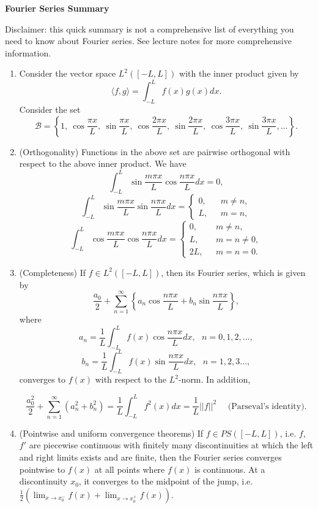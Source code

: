 \documentclass[a4paper]{article}
\theoremstyle{definition}
\numberwithin{equation}{section}
\begin{document}
\begin{center}
\large \textbf{Fourier Series Summary}
\end{center}
Disclaimer: this quick summary is not a comprehensive list of everything you need to know about Fourier series.  See lecture notes for more comprehensive information.
\normalsize

\begin{enumerate}
	\item Consider the vector space $L^2([-L, L])$ with the inner product given by 
\[\langle f,g\rangle =\int_{-L}^L f(x)g(x)dx.\]
Consider the set 
\[\mathcal B= \left\{1,\ \cos \frac{\pi x}{L},\  \sin \frac{\pi x}{L},\  \cos \frac{2\pi x}{L},\  \sin \frac{2\pi x}{L},\  \cos \frac{3\pi x}{L} ,\  \sin \frac{3\pi x}{L}, \ldots\right\}.\] 
  \item (Orthogonality) Functions in the above set are pairwise orthogonal with respect to the above inner product.  We have 
\[\int_{-L}^L \sin \frac{m\pi x}{L}\cos \frac{n\pi x}{L}dx=0,\]
\[\int_{-L}^L \sin \frac{m\pi x}{L}\sin \frac{n\pi x}{L}dx =\left\{ \begin{array}{ll} 0, & \ \ \ m\neq n, \\ L, & \ \ \  m=n,\end{array} \right.\]
\[\int_{-L}^L \cos \frac{m\pi x}{L}\cos \frac{n\pi x}{L}dx =\left\{ \begin{array}{ll} 0, & \ \ \ m\neq n, \\ L, & \ \ \  m=n\neq 0, \\ 2L, & \ \ \ m=n=0.\end{array} \right.\]


\item (Completeness) If $f\in L^2([-L, L])$, then its Fourier series, which is given by 
\[\frac{a_0}{2}+\sum_{n=1}^\infty\left\{a_n\cos \frac{n\pi x}{L}+b_n\sin \frac{n\pi x}{L}\right\},\]
	where
	\[a_n= \frac{1}{L}\int_{-L}^L f(x)\cos \frac{n\pi x}{L}dx, \ \ \  n= 0,1,2,\ldots,\]
	\[b_n=\frac{1}{L}\int_{-L}^L f(x)\sin \frac{n\pi x}{L}dx, \ \ \  n= 1,2,3\ldots,\]
 converges to $f(x)$ with respect to the $L^2$-norm.   In addition,
	
	\[\frac{a_0^2}{2}+\sum_{n=1}^\infty(a_n^2+b_n^2)= \frac{1}{L}\int_{-L}^{L} f^2(x)dx=\frac{1}{L}||f||^2\quad \text{ (Parseval's identity)}.\]
	
\item (Pointwise and uniform convergence theorems)
If $f\in PS([-L,L])$, i.e. $f$, $f'$ are piecewise continuous with finitely many discontinuities at which the left and right limits exists and are finite, then the Fourier series converges pointwise to $f(x)$ at all points where $f(x)$ is continuous.  At a discontinuity $x_0$, it converges to the midpoint of the jump, i.e. $\frac{1}{2}\left(\lim_{x\to x_0^-} f(x)+\lim_{x\to x_0^+}f(x)\right).$\\


\end{enumerate}
\end{document}
